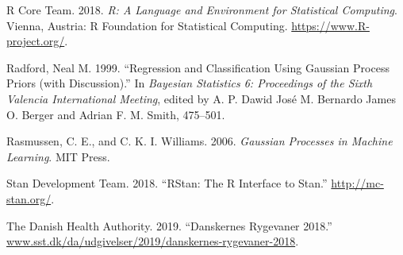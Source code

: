 \documentclass[11pt,]{article}
\theoremstyle{nonumberplain}
\begin{document}
\hypertarget{ref-R-Core-Team:2018aa}{}
R Core Team. 2018. \emph{R: A Language and Environment for Statistical
Computing}. Vienna, Austria: R Foundation for Statistical Computing.
\url{https://www.R-project.org/}.

\hypertarget{ref-neal1999regression}{}
Radford, Neal M. 1999. ``Regression and Classification Using Gaussian
Process Priors (with Discussion).'' In \emph{Bayesian Statistics 6:
Proceedings of the Sixth Valencia International Meeting}, edited by A.
P. Dawid José M. Bernardo James O. Berger and Adrian F. M. Smith,
475--501.

\hypertarget{ref-rasmussen2003gaussian}{}
Rasmussen, C. E., and C. K. I. Williams. 2006. \emph{Gaussian Processes
in Machine Learning}. MIT Press.

\hypertarget{ref-rstan}{}
Stan Development Team. 2018. ``RStan: The R Interface to Stan.''
\url{http://mc-stan.org/}.

\hypertarget{ref-sst}{}
The Danish Health Authority. 2019. ``Danskernes Rygevaner 2018.''
\url{www.sst.dk/da/udgivelser/2019/danskernes-rygevaner-2018}.
\end{document}

